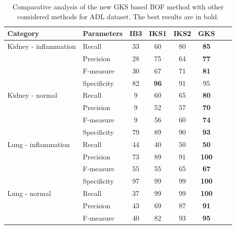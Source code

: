 \begin{table}[t!]
\renewcommand{\arraystretch}{1.2}
    \centering
    \footnotesize
    \caption[Comparative analysis of the GKS based BOF method with other considered methods for ADL dataset in terms of various performance parameters]{\fontsize{10pt}{12pt}\selectfont Comparative analysis of the new GKS based BOF method with other considered methods for ADL dataset. The best results are in bold.    }
    \label{ch3:tab:adl}
    \begin{tabular}{|p{1.5in}|p{1.5in}|c|c|c|c|c|c|}
        \hline
        \textbf{Category}   &    \textbf{Parameters}    &    \textbf{IB3}    &    \textbf{IKS1}    &    \textbf{IKS2}    &    \textbf{GKS}    \\
     \hline
      Kidney - inflammation    &    Recall    &    33    &    60    &    80    &\textbf{    85    }\\
        &    Precision    &    28    &    75    &    64    &\textbf{    77    }\\
        &    F-measure    &    30    &    67    &    71    &\textbf{    81    }\\
        &   Specificity &   82  &   \textbf{96}  &   91  & 95\\
        \hline
        Kidney - normal    &    Recall    &    9    &    60    &    65    &\textbf{    80    }\\
        &    Precision    &    9    &    52    &    57    &\textbf{    70    }\\
        &    F-measure    &    9    &    56    &    60    &\textbf{    74    }\\
        &   Specificity &   79  &  89  &   90  & \textbf{93}\\
        \hline
        Lung - inflammation    &    Recall    &    44    &    40    &    50    &\textbf{    50    }\\
        &    Precision    &    73    &    89    &    91    &\textbf{    100    }\\
        &    F-measure    &    55    &    55    &    65    &\textbf{    67    }\\
        &   Specificity &   97  &  99  &   99  & \textbf{100}\\
        \hline
        Lung - normal    &    Recall    &    37    &    99    &    99    &\textbf{    100    }\\
        &    Precision    &    43    &    69    &    87    &\textbf{    91    }\\
        &    F-measure    &    40    &    82    &    93    &\textbf{    95    }\\

\end{tabular}
\end{table}
